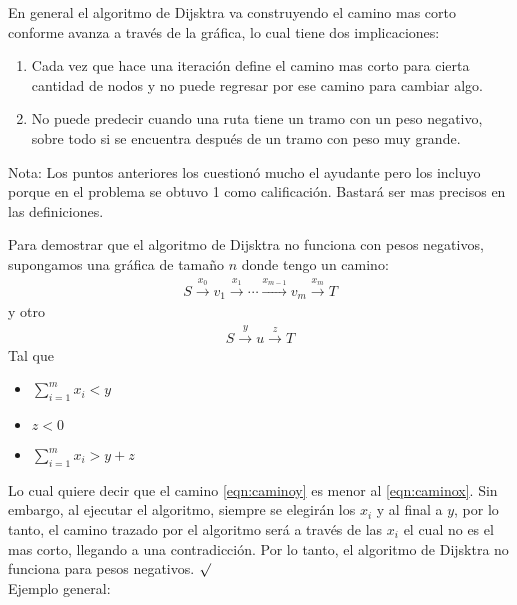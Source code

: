 \documentclass[9pt,spanish]{article}
\begin{document}
En general el algoritmo de Dijsktra va construyendo el camino mas corto conforme avanza a trav\'es de la gr\'afica, lo cual tiene dos implicaciones:
\begin{enumerate}
\item Cada vez que hace una iteraci\'on define el camino mas corto para cierta cantidad de nodos y no puede regresar por ese camino para cambiar algo.
\item No puede predecir cuando una ruta tiene un tramo con un peso negativo, sobre todo si se encuentra despu\'es de un tramo con peso muy grande.
\end{enumerate}
Nota: Los puntos anteriores los cuestionó mucho el ayudante pero los incluyo porque en el problema se obtuvo 1 como calificación.  Bastará ser mas precisos en las definiciones.

Para demostrar que el algoritmo de Dijsktra no funciona con pesos negativos, supongamos una gr\'afica de tama\~no $n$ donde tengo un camino:
\begin{eqnarray}
\label{eqn:caminox}
S   \xrightarrow{x_0} v_1 \xrightarrow{x_1} \cdots \xrightarrow{x_{m-1}} v_m \xrightarrow{x_m} T 
\end{eqnarray}
 y otro 
\begin{eqnarray}
\label{eqn:caminoy}
S \xrightarrow{y} u \xrightarrow{z} T 
\end{eqnarray} 
 Tal que
\begin{itemize}
\item   $\displaystyle\sum_{i=1}^{m} x_i < y$
\item  $z<0$ 
\item  $\displaystyle\sum_{i=1}^{m} x_i > y+z$ 
\end{itemize}
Lo cual quiere decir que  el camino \ref{eqn:caminoy}  es menor al \ref{eqn:caminox}.
Sin embargo, al ejecutar el algoritmo, siempre se elegir\'an los $x_i$  y al final a $y$, por lo tanto, el camino trazado por el algoritmo ser\'a a trav\'es de las $x_i$ el cual no es el mas corto, llegando a una contradicci\'on.  Por lo tanto, el algoritmo de Dijsktra no funciona para pesos negativos. $\surd$ \\
Ejemplo general:

\end{document}
